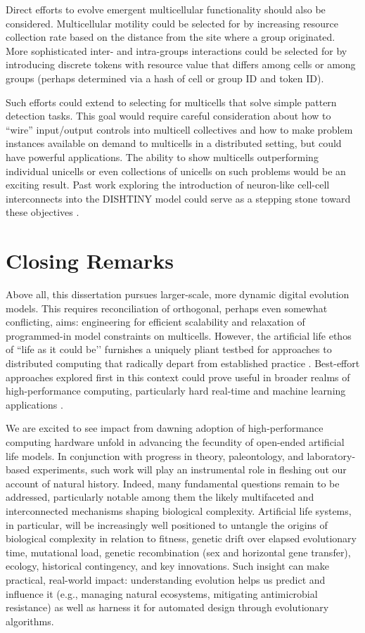 Direct efforts to evolve emergent multicellular functionality should also be considered.
Multicellular motility could be selected for by increasing resource collection rate based on the distance from the site where a group originated.
More sophisticated inter- and intra-groups interactions could be selected for by introducing discrete tokens with resource value that differs among cells or among groups (perhaps determined via a hash of cell or group ID and token ID).

Such efforts could extend to selecting for multicells that solve simple pattern detection tasks.
This goal would require careful consideration about how to ``wire'' input/output controls into multicell collectives and how to make problem instances available on demand to multicells in a distributed setting, but could have powerful applications.
The ability to show multicells outperforming individual unicells or even collections of unicells on such problems would be an exciting result.
Past work exploring the introduction of neuron-like cell-cell interconnects into the DISHTINY model could serve as a stepping stone toward these objectives \citep{moreno2020practical}.

\section{Closing Remarks}

Above all, this dissertation pursues larger-scale, more dynamic digital evolution models.
This requires reconciliation of orthogonal, perhaps even somewhat conflicting, aims: engineering for efficient scalability and relaxation of programmed-in model constraints on multicells.
However, the artificial life ethos of ``life as it could be’’ furnishes a uniquely pliant testbed for approaches to distributed computing that radically depart from established practice \citep{forbes2000life}.
Best-effort approaches explored first in this context could prove useful in broader realms of high-performance computing, particularly hard real-time and machine learning applications  \citep{rhodes2020real}.

We are excited to see impact from dawning adoption of high-performance computing hardware unfold in advancing the fecundity of open-ended artificial life models.
In conjunction with progress in theory, paleontology, and laboratory-based experiments, such work will play an instrumental role in fleshing out our account of natural history.
Indeed, many fundamental questions remain to be addressed, particularly notable among them the likely multifaceted and interconnected mechanisms shaping biological complexity.
Artificial life systems, in particular, will be increasingly well positioned to untangle the origins of biological complexity in relation to fitness, genetic drift over elapsed evolutionary time, mutational load, genetic recombination (sex and horizontal gene transfer), ecology, historical contingency, and key innovations.
Such insight can make practical, real-world impact: understanding evolution helps us predict and influence it (e.g., managing natural ecosystems, mitigating antimicrobial resistance) as well as harness it for automated design through evolutionary algorithms.


